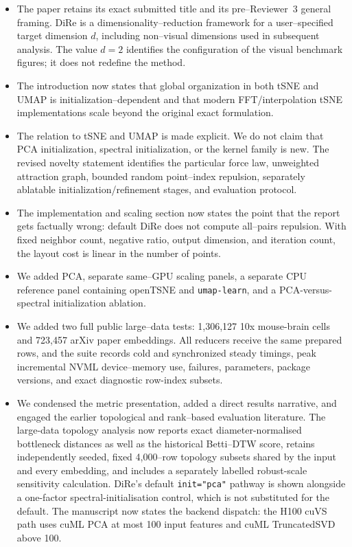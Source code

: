 \documentclass[11pt]{article}
\begin{document}
\begin{itemize}
  \item The paper retains its exact submitted title and its pre--Reviewer~3
  general framing. DiRe is a dimensionality--reduction framework for a
  user--specified target dimension $d$, including non--visual dimensions used
  in subsequent analysis. The value $d=2$ identifies the configuration of the
  visual benchmark figures; it does not redefine the method.
  \item The introduction now states that global organization in both tSNE and
  UMAP is initialization--dependent and that modern FFT/interpolation tSNE
  implementations scale beyond the original exact formulation.
  \item The relation to tSNE and UMAP is made explicit. We do not claim that
  PCA initialization, spectral initialization, or the kernel family is new.
  The revised novelty statement identifies the particular force law, unweighted
  attraction graph, bounded random point--index repulsion, separately
  ablatable initialization/refinement stages, and evaluation protocol.
  \item The implementation and scaling section now states the point that the
  report gets factually wrong: default DiRe does not compute all--pairs
  repulsion. With fixed neighbor count, negative ratio, output dimension, and
  iteration count, the layout cost is linear in the number of points.
  \item We added PCA, separate same--GPU scaling panels, a separate CPU
  reference panel containing openTSNE and \texttt{umap-learn}, and a
  PCA-versus-spectral initialization ablation.
  \item We added two full public large--data tests: 1,306,127 10x mouse-brain
  cells and 723,457 arXiv paper embeddings. All reducers receive the same
  prepared rows, and the suite records cold and synchronized steady timings,
  peak incremental NVML device--memory use, failures, parameters, package
  versions, and exact diagnostic row-index subsets.
  \item We condensed the metric presentation, added a direct results narrative,
  and engaged the earlier topological and rank--based evaluation literature.
  The large-data topology analysis now reports exact diameter-normalised
  bottleneck distances as well as the historical Betti--DTW score, retains
  \TopologySubsetCount{} independently seeded, fixed 4,000--row topology
  subsets shared by the input and every embedding, and includes a separately
  labelled robust-scale sensitivity calculation. DiRe's default
  \texttt{init="pca"} pathway is shown
  alongside a one-factor spectral-initialisation control, which is not
  substituted for the default. The manuscript now states the backend dispatch:
  the H100 cuVS path uses cuML PCA at most 100 input features and cuML
  TruncatedSVD above 100.
\end{itemize}
\end{document}
